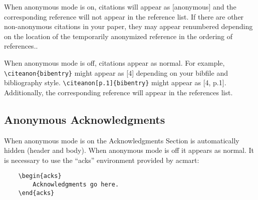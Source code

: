 \documentclass[sigconf, balance=false]{acmart}
\begin{document}
\noindent When anonymous mode is on, citations will appear as [anonymous] and the corresponding reference will not appear in the reference list. If there are other non-anonymous citations in your paper, they may appear renumbered depending on the location of the temporarily anonymized reference in the ordering of references.. 

When anonymous mode is off, citations appear as normal. For example, \texttt{\textbackslash citeanon\{bibentry\}} might appear as [4] depending on your bibfile and bibliography style. \texttt{\textbackslash citeanon[p.1]\{bibentry\}} might appear as [4, p.1]. Additionally, the corresponding reference will appear in the references list. 

\subsection{Anonymous Acknowledgments}
\label{sec:acks}
When anonymous mode is on the Acknowledgments Section is automatically hidden (header and body). When anonymous mode is off it appears as normal. It is necessary to use the ``acks'' environment provided by acmart:

\begin{verbatim}
    \begin{acks}
        Acknowledgments go here. 
    \end{acks}
\end{verbatim}
\end{document}
